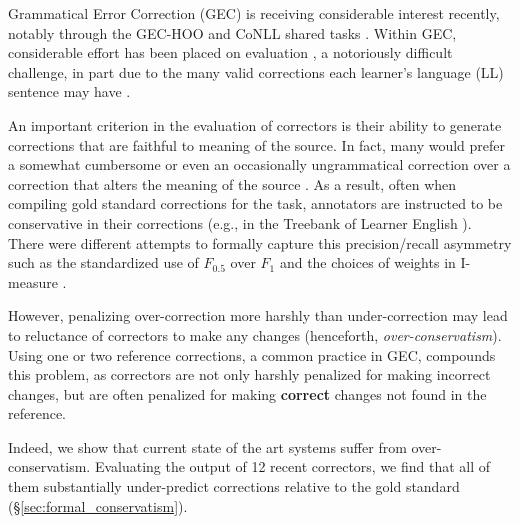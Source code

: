 \documentclass[letter,11pt]{article}
\begin{document}
%
Grammatical Error Correction (GEC) is receiving considerable
interest recently, notably through the GEC-HOO \cite{dale2011helping,dale2012hoo} and
CoNLL shared tasks \cite{kao2013conll,ng2014conll}.
Within GEC, considerable effort has been placed on evaluation
\cite{tetreault2008native,madnani2011they,felice2015towards,napoles2015ground},
a notoriously difficult challenge, in part due to the many valid corrections each learner's language (LL) sentence may
have \cite{chodorow2012problems}.

An important criterion in the evaluation of correctors
is their ability to generate corrections that are faithful to meaning of the source.
In fact, many would prefer a somewhat cumbersome or even an occasionally ungrammatical
correction over a correction that alters the meaning of the source \cite{brockett2006correcting}.
As a result, often when compiling gold standard corrections for the task,
annotators are instructed to be conservative in their corrections
(e.g., in the Treebank of Learner English \cite{nicholls2003cambridge}).
There were different attempts to formally capture this precision/recall asymmetry such as the standardized use of $F_{0.5}$ over $F_{1}$ \cite{dahlmeier2012better} and the choices of weights in I-measure \cite{felice2015towards}.

However, penalizing over-correction more harshly than under-correction
may lead to reluctance of correctors to
make any changes (henceforth, {\it over-conservatism}).
Using one or two reference corrections, a common practice in GEC,
compounds this problem, as correctors are not only harshly penalized for making incorrect changes,
but are often penalized for making {\bf correct} changes not found in the reference.

Indeed, we show that current state of the art systems suffer from over-conservatism.
Evaluating the output of 12 recent correctors, we find that all of them
substantially under-predict corrections relative to the gold standard (\S \ref{sec:formal_conservatism}).
\end{document}
